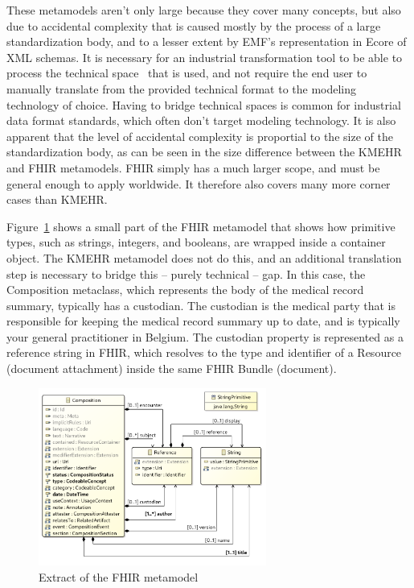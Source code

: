 \documentclass[
twocolumn,
]{ceurart}
\begin{document}
These metamodels aren't only large because they cover many concepts, but also
due to accidental complexity that is caused mostly by the process of a large
standardization body, and to a lesser extent by EMF's representation in Ecore
of XML schemas. It is necessary for an industrial transformation tool to be
able to process the technical space~\cite{conf/gttse/Bezivin2005} that is
used, and not require the end user to manually translate from the provided
technical format to the modeling technology of choice.
Having to bridge technical spaces is common for industrial data format standards,
which often don't target modeling technology. It is also apparent that the
level of accidental complexity is proportial to the size of the standardization
body, as can be seen in the size difference between the KMEHR and FHIR
metamodels. FHIR simply has a much larger scope, and must be general enough
to apply worldwide. It therefore also covers many more corner cases than
KMEHR.

Figure~\ref{fig:fhirextract} shows
a small part of the FHIR metamodel that shows how primitive types, such as
strings, integers, and booleans, are wrapped inside a container object.
The KMEHR metamodel does not do this, and an additional translation step
is necessary to bridge this -- purely technical -- gap. In this case,
the Composition metaclass, which represents the body of the medical record
summary, typically has a custodian. The custodian is the medical party that
is responsible for keeping the medical record summary up to date, and is
typically your general practitioner in Belgium. The custodian property is
represented as a reference string in FHIR, which resolves to the type and
identifier of a Resource (document attachment) inside the same FHIR
Bundle (document).

\begin{figure}[ht]
\centerline{
\includegraphics[width=7.5cm]{figures/fhirextract}}
\caption{Extract of the FHIR metamodel}
\label{fig:fhirextract}
\end{figure}
\end{document}
